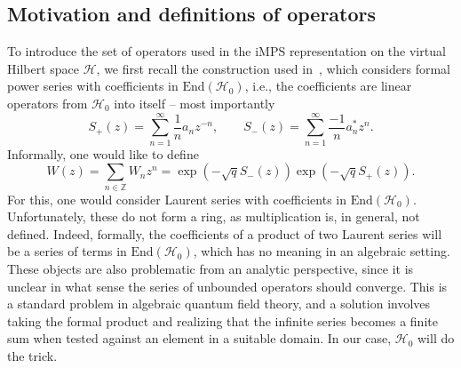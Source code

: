 \documentclass[letterpaper, DIV=17]{scrartcl}
\numberwithin{equation}{section}
\theoremstyle{definition}
\begin{document}
		
	
	
		\subsection{Motivation and definitions of operators}	
		To introduce the set of operators used in the iMPS representation on the virtual Hilbert space  $\mathcal{H}$, we first recall the construction used in~\cite{estienne2013fractional}, which 
		 considers formal power series with coefficients in $\mathrm{End}(\mathcal{H}_0)$, i.e., the coefficients are linear operators from $\mathcal{H}_0$ into itself -- most importantly		
		\begin{equation} \label{def S+ S-}
				S_+(z) = \sum_{n=1}^\infty \frac{1}{n} a_n z^{-n}, \qquad S_-(z) = \sum_{n=1}^\infty \frac{-1}{n} a_n^* z^{n}.
		\end{equation}
		Informally, one would like to define
		\begin{equation}\label{eq:informalW}
			W(z) = \sum_{n\in \mathbb{Z}} W_n z^n 
			=\exp\left(-\sqrt{q} S_-(z)\right) \exp\left(-\sqrt{q} S_+(z)\right).
		\end{equation}
		For this, one would consider Laurent series with coefficients in $\mathrm{End}(\mathcal{H}_0)$. Unfortunately, these do not form a ring, as multiplication is, in general, not defined. Indeed, formally, the coefficients of a product of two Laurent series will be a series of terms in $\mathrm{End}(\mathcal{H}_0)$, which has no meaning in an algebraic setting. These objects are also problematic from an analytic perspective, since it is unclear in what sense the series of unbounded operators should converge. This is a standard problem in algebraic quantum field theory, and a solution involves taking the formal product and realizing that the infinite series becomes a finite sum when tested against an element in a suitable domain. In our case, $\mathcal{H}_0$ will do the trick.
		
\end{document}
